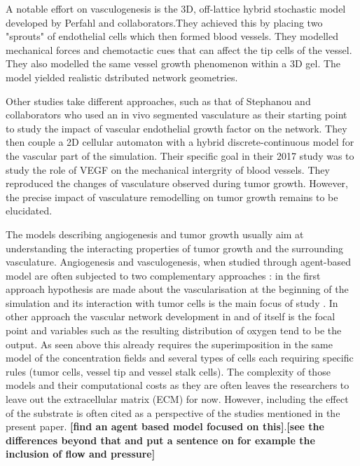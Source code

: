 \documentclass[11pt,a4paper]{article}
\begin{document}
A notable  effort on vasculogenesis is the 3D, off-lattice hybrid stochastic model developed by Perfahl and collaborators.\cite{Perfahl2016}They achieved this by placing two "sprouts" of endothelial cells which then formed blood vessels. They modelled mechanical forces and chemotactic cues that can affect the tip cells of the vessel. They also modelled the same  vessel growth phenomenon within a 3D gel. The model yielded realistic dstributed network geometries.

%
Other studies take different approaches, such as that of Stephanou and collaborators who used an in vivo segmented vasculature as their starting point to study the impact of vascular endothelial growth factor on the network. They then couple a 2D cellular automaton with a hybrid discrete-continuous model for the vascular part of the simulation. \cite{Stephanou2017} Their specific goal in their 2017 study was to study the role of VEGF on the mechanical intergrity of blood vessels. They reproduced the changes of vasculature observed during tumor growth. However, the precise impact of vasculature remodelling on tumor growth remains to be elucidated. 

The models describing angiogenesis and tumor growth usually aim at understanding the interacting properties of tumor growth and the surrounding vasculature.  Angiogenesis and vasculogenesis, when studied through agent-based model are often subjected to two complementary approaches :  in the first approach  hypothesis are made about the vascularisation at the beginning of the simulation and its interaction with tumor cells is the main focus of study \cite{Phillips2020}. In other approach the vascular network development in  and of itself is the focal point and variables such as the resulting distribution of oxygen tend to be the output. \cite{Secomb2013}  As seen above this already requires the superimposition in the same model of the concentration fields and several types of cells each requiring specific rules (tumor cells, vessel tip and vessel stalk cells). The complexity of those models and their computational costs as they are often leaves the researchers to leave out the extracellular matrix (ECM) for now. However, including the effect of the substrate is often cited as a perspective of the studies mentioned in the present paper. 
\textbf{[find an agent based model focused on this]}.\textbf{[see the differences beyond that and put a sentence on for example the inclusion of flow and pressure]}
\end{document}
